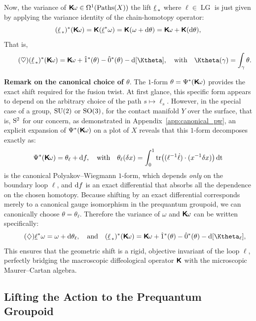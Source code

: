 \documentclass[11pt,reqno,letterpaper,twoside]{amsart}
\renewcommand{\Komega}{\CHO\!\omega}
\def\u(#1){\uline{#1}}
\newcommand{\LG}{\operatorname{LG}}
\begin{document}
  Now,
  the variance of $\Komega \in \Omega^1(\Paths(X))$ the lift $\u(\ell)_{\,*}$ where $\ell \in \LG$ is just given by applying the variance identity of the chain-homotopy operator:
  $$
    (\u(\ell)_{\,*})^*(\Komega) = \CHO(\u(\ell)^* \omega) = \CHO(\omega + \der\theta) = \Komega + \CHO(\der\theta),
    $$
  That is,
  \[ \tag{$\heartsuit$}
    (\u(\ell)_{\,*})^*(\Komega)  = \Komega + \1^*(\theta) - \0^*(\theta) - \der[\Ktheta],
    \qtext{with}
    \Ktheta(\gamma) = \int_\gamma \theta.
    \]
  
  \textbf{Remark on the canonical choice of $\theta$}.
  The $1$-form $\theta = \Psi^*(\Komega)$ provides the exact shift required for the fusion twist.
  At first glance,
  this specific form appears to depend on the arbitrary choice of the path $s \mapsto \ell_s$.
  However,
  in the special case of a group,
  $\mathrm{SU}(2)$ or $\mathrm{SO}(3)$,
  for the contact manifold $Y$ over the surface,
  that is,
  $\mathrm{S}^2$ for our concern,
  as demonstrated in Appendix~\ref{app:canonical_pw},
  an explicit expansion of $\Psi^*(\Komega)$ on a plot of $X$ reveals that this $1$-form decomposes exactly as:
  \[
    \Psi^*(\Komega) = \theta_\ell + \der f,
    \qtext{with}
    \theta_\ell(\delta x) = \int_0^1 \Tr\bigl( (\ell^{-1} \dot{\ell}) \cdot (x^{-1} \delta x) \bigr)\, \dt
    \]
  is the canonical Polyakov--Wiegmann $1$-form,
  which depends \emph{only} on the boundary loop $\ell$,
  and $\mathrm{d} f$ is an exact differential that absorbs all the dependence on the chosen homotopy.
  Because shifting by an exact differential corresponds merely to a canonical gauge isomorphism in the prequantum groupoid,
  we can canonically choose $\theta = \theta_\ell$.
  Therefore the variance of $\omega$ and $\Komega$ can be written specifically:
  \[ \tag{$\diamondsuit$}
    \u(\ell)^*\omega = \omega + \der\theta_\ell,
    \qtext{and}
    (\u(\ell)_{\,*})^*(\Komega)  = \Komega + \1^*(\theta) - \0^*(\theta) - \der[\Ktheta_\ell],
    \]
  This ensures that the geometric shift is a rigid,
  objective invariant of the loop $\ell$,
  perfectly bridging the macroscopic diffeological operator $\boldsymbol{\mathsf{K}}$ with the microscopic Maurer--Cartan algebra.
  
  \subsection{Lifting the Action to the Prequantum Groupoid}
  
\end{document}
